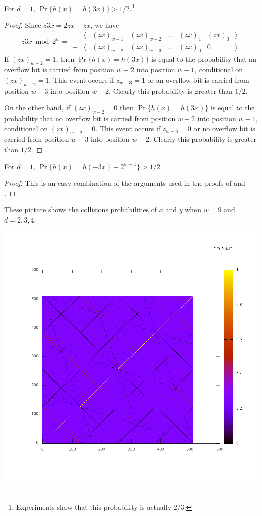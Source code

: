 \documentclass{patmorin}
\begin{document}
\begin{clm}
For $d=1$, $\Pr\{h(x) = h(3x)\} > 1/2$.\footnote{Experiments show that this probability is actually $2/3$.}
\end{clm}

\begin{proof}
Since $z3x=2zx + zx$, we have
\[
z3x\bmod 2^w =
\begin{array}{rrrrrrrrrr}
& \langle & (zx)_{w-1}& (zx)_{w-2}& \ldots&(zx)_1&(zx)_0 & \rangle \\ 
+& \langle & (zx)_{w-2}& (zx)_{w-3}&\ldots&(zx)_0& 0 & \rangle  
\end{array}
\]
If $(zx)_{w-2} = 1$, then $\Pr\{h(x)=h(3x)\}$ is equal to the probability
that an overflow bit is carried from position $w-2$ into position $w-1$,
conditional on $(zx)_{w-2} = 1$.  This event occurs if $z_{w-3}=1$
or an overflow bit is carried from position $w-3$ into position $w-2$.
Clearly this probability is greater than $1/2$.

On the other hand, if $(zx)_{w-2} = 0$ then $\Pr\{h(x)=h(3x)\}$ is equal
to the probability that no overflow bit is carried from position $w-2$
into position $w-1$, conditional on $(zx)_{w-2} = 0$.  This event occurs
if $z_{w-3}=0$ or no overflow bit is carried from position $w-3$ into
position $w-2$.  Clearly this probability is greater than $1/2$.
\end{proof}

\begin{clm}
For $d=1$, $\Pr\{h(x)=h(-3x)+2^{w-1}\} > 1/2$.
\end{clm}

\begin{proof}
This is an easy combination of the arguments used in the proofs of  and .
\end{proof}

These picture shows the collisions probabilities of $x$ and $y$ when $w=9$
and $d=2,3,4$.

\noindent \includegraphics[width=\textwidth]{9-2}
\end{document}
